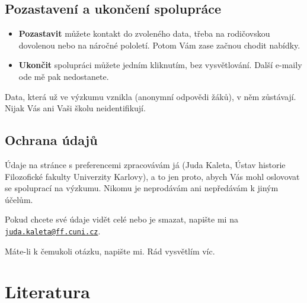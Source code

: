 \documentclass[
  12pt,
  english,
  a4paper,
  extrafontsizes,onecolumn,openright
  ]{memoir}
\makeatletter
\providecommand{\tightlist}{%
  \setlength{\itemsep}{0pt}\setlength{\parskip}{0pt}}
\newcommand{\MemoirChapStyle}{daleif1}
\newcommand{\MemoirPageStyle}{Ruled}
\newlength\widthw %
\newcommand*{\SmallMargins}{
  \setlrmarginsandblock{1.5in}{1.5in}{*}
  \setmarginnotes{0.1in}{0.1in}{0.1in}
 \setulmarginsandblock{1.5in}{1in}{*}
  \checkandfixthelayout
  \ch@ngetext
  \clearpage
  \setlength{\widthw}{\textwidth+\marginparsep+\marginparwidth}
  \footnotesatfoot
  \chapterstyle{\MemoirChapStyle}  %
  \pagestyle{\MemoirPageStyle}
}
\newcommand{\LargeMargins}{\SmallMargins}
\makeatother
\begin{document}
\section{Pozastavení a ukončení spolupráce}\label{spoluprace-ukonceni}

\begin{itemize}
\tightlist
\item
  \textbf{Pozastavit} můžete kontakt do zvoleného data, třeba na rodičovskou
  dovolenou nebo na náročné pololetí. Potom Vám zase začnou chodit
  nabídky.
\item
  \textbf{Ukončit} spolupráci můžete jedním kliknutím, bez vysvětlování.
  Další e-maily ode mě pak nedostanete.
\end{itemize}

Data, která už ve výzkumu vznikla (anonymní odpovědi žáků), v něm
zůstávají. Nijak Vás ani Vaši školu neidentifikují.

\section{Ochrana údajů}\label{spoluprace-udaje}

Údaje na stránce s preferencemi zpracovávám já (Juda Kaleta, Ústav
historie Filozofické fakulty Univerzity Karlovy), a to jen proto, abych
Vás mohl oslovovat se spoluprací na výzkumu. Nikomu je neprodávám ani
nepředávám k jiným účelům.

Pokud chcete své údaje vidět celé nebo je smazat, napište mi na
\href{mailto:juda.kaleta@ff.cuni.cz}{\nolinkurl{juda.kaleta@ff.cuni.cz}}.

Máte-li k čemukoli otázku, napište mi. Rád vysvětlím víc.

\chapter*{Literatura}\label{literatura}



\backmatter
\SmallMargins

\twocolumn
\renewcommand*{\bibfont}{\scriptsize}
\printbibliography
\onecolumn




\cleardoublepage
\LargeMargins
\listoffigures


\end{document}
